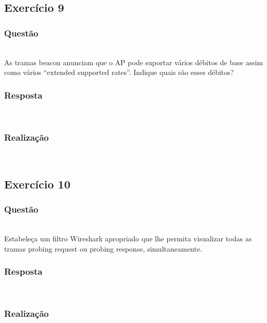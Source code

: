 \documentclass{llncs}
\begin{document}
\subsection{Exercício 9}
\subsubsection{Questão}\rule[-10pt]{0pt}{10pt}\\

As tramas beacon anunciam que o AP pode suportar vários débitos de base assim como vários “extended supported rates”. Indique quais são esses débitos?

\subsubsection{Resposta}\rule[-10pt]{0pt}{10pt}\\



\subsubsection{Realização}\rule[-10pt]{0pt}{10pt}\\



\clearpage
\subsection{Exercício 10}
\subsubsection{Questão}\rule[-10pt]{0pt}{10pt}\\

Estabeleça um filtro Wireshark apropriado que lhe permita visualizar todas as tramas probing request ou probing response, simultaneamente.

\subsubsection{Resposta}\rule[-10pt]{0pt}{10pt}\\



\subsubsection{Realização}\rule[-10pt]{0pt}{10pt}\\
\end{document}
